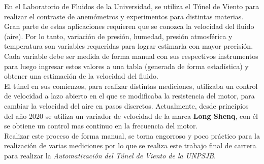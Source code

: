 En el Laboratorio de Fluidos de la Universidad, se utiliza el Túnel de Viento para realizar el contraste de anemómetros y experimentos para distintas materias. Gran parte de estas aplicaciones requieren que se conozca la velocidad del fluido (aire). Por lo tanto, variación de presión, humedad, presión atmosférica y temperatura son variables requeridas para lograr estimarla con mayor precisión.
Cada variable debe ser medida de forma manual con sus respectivos instrumentos para luego ingresar estos valores a una tabla (generada de forma estadística) y obtener una estimación de la velocidad del fluido.\\

El túnel en sus comienzos, para realizar distintas mediciones, utilizaba un control de velocidad a lazo abierto en el que se modificaba la resistencia del motor, para cambiar la velocidad del aire en pasos discretos. Actualmente, desde principios del año 2020 se utiliza un variador de velocidad de la marca \textbf{Long Shenq}, con él se obtiene un control mas continuo en la frecuencia del motor. \\

Realizar este proceso de forma manual, se torna engorroso y poco práctico para la realización de varias mediciones por lo que se realiza este trabajo final de carrera para realizar la \textit{Automatización del Túnel de Viento de la UNPSJB}.

\newpage